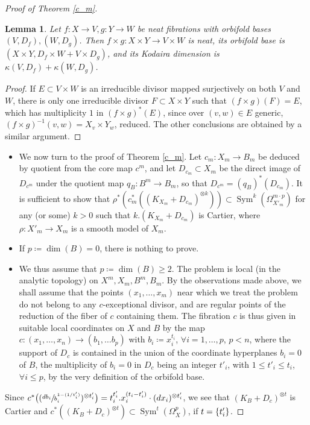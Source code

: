 \documentclass[JEP,XML,SOM,Unicode, NoEqCountersInSection,NoFloatCountersInSection,published]{cedram}
\newcommand{\NoChangel}[1]{%
\expandafter\let\csname old\string#1\endcsname=#1
\let#1=\relax
\newcommand{#1}{\mathcode`l="716C\csname old\string#1\endcsname\mathcode`l="7160 }%
}
\DeclareMathOperator{\lcm}{lcm} \NoChangel{\lcm}
\DeclareMathOperator{\Sym}{Sym}
\theoremstyle{theorem}
\newtheorem{lemma}[proposition]{Lemma}
\theoremstyle{definition}
\begin{document}
\begin{proof} [Proof of Theorem \ref{c_m}]
\begin{lemma} Let $f:X\to V, g:Y\to W$ be neat fibrations with orbifold bases $(V,D_f), (W,D_g)$. Then $f\times g: X\times Y\to V\times W$ is neat, its orbifold base is \hbox{$(X\times Y, D_f\times W+V\times D_g)$}, and its Kodaira dimension is $\kappa(V,D_f)+\kappa(W,D_g)$. \end{lemma}
\begin{proof} If $E\subset V\times W$ is an irreducible divisor mapped surjectively on both $V$ and $W$, there is only one irreducible divisor $F\subset X\times Y$ such that $(f\times g)(F)=E$, which has multiplicity $1$ in $(f\times g)^*(E)$, since over $(v,w)\in E$ generic, $(f\times g)^{-1}(v,w)=X_v\times Y_w$, reduced. The other conclusions are obtained by a similar argument.
\end{proof}

\begin{itemize}
\item
We now turn to the proof of Theorem \ref{c_m}. Let $c_m:X_m\to B_m$ be deduced by quotient from the core map $c^m$, and let $D_{c_m}\subset X_m$ be the direct image of $D_{c^m}$ under the quotient map $q_B:B^m\to B_m$, so that $D_{c^m}=(q_B)^*(D_{c_m})$. It is sufficient to show that $\rho^*(c_m^*((K_{X_m}+D_{c_m})^{\otimes k}))\subset \Sym^k(\Omega^{m\cdot p}_{X'_m})$ for any (or some) $k>0$ such that $k.(K_{X_m}+D_{c_m})$ is Cartier, where $\rho:X'_m\to X_m$ is a smooth model of $X_m$.

\item
If $p\coloneqq \dim(B)=0$, there is nothing to prove.

\item
We thus assume that $p\coloneqq \dim(B)\geq 2$. The problem is local (in the analytic topology) on $X^m,X_m,B^m,B_m$. By the observations made above, we shall assume that the points $(x_1,\dots,x_m)$ near which we treat the problem do not belong to any $c$-exceptional divisor, and are regular points of the reduction of the fiber of $c$ containing them. The fibration $c$ is thus given in suitable local coordinates on $X$ and $B$ by the map $c:(x_1,\dots, x_n)\to (b_1,\dots b_p)$ with $b_i\coloneqq x_i^{t_i}$, $\forall i=1,\dots, p$, $p<n$, where the support of $D_c$ is contained in the union of the coordinate hyperplanes $b_i=0$ of $B$, the multiplicity of $b_i=0$ in $D_c$ being an integer $t'_i$, with $1\leq t'_i\leq t_i$, $\forall i\leq p$, by the very definition of the orbifold base.
\end{itemize}

Since $c^*\bigl((\sfrac{db_i}{b_i^{1-(1/t'_i)}})^{\otimes t'_i}\bigr)=t_i^{t'_i}.x_i^{(t_i-t'_i)}\cdot(dx_i)^{\otimes t'_i}$, we see that $(K_B+D_c)^{\otimes t}$ is Cartier and $c^*((K_B+D_c)^{\otimes t})\subset \Sym^t(\Omega^p_X)$, if $t=\lcm\{t'_i\}$.


\end{proof}
\end{document}
